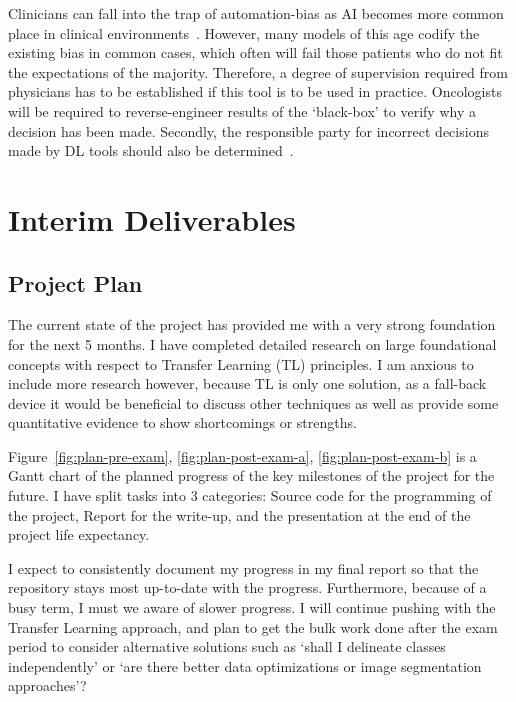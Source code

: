 \documentclass[11pt,twoside]{report}
\begin{document}
Clinicians can fall into the trap of automation-bias as AI becomes more common place in clinical environments~\cite{automation-bias}. However, many models of this age codify the existing bias in common cases, which often will fail those patients who do not fit the expectations of the majority. Therefore, a degree of supervision required from physicians has to be established if this tool is to be used in practice. Oncologists will be required to reverse-engineer results of the `black-box' to verify why a decision has been made. Secondly, the responsible party for incorrect decisions made by DL tools should also be determined~\cite{AI-in-cancer-diagnosis-era}.

\chapter{Interim Deliverables}

\section{Project Plan}

The current state of the project has provided me with a very strong foundation for the next 5 months. I have completed detailed research on large foundational concepts with respect to Transfer Learning (TL) principles. I am anxious to include more research however, because TL is only one solution, as a fall-back device it would be beneficial to discuss other techniques as well as provide some quantitative evidence to show shortcomings or strengths.

Figure~\ref{fig:plan-pre-exam}, \ref{fig:plan-post-exam-a}, \ref{fig:plan-post-exam-b} is a Gantt chart of the planned progress of the key milestones of the project for the future. I have split tasks into 3 categories: Source code for the programming of the project, Report for the write-up, and the presentation at the end of the project life expectancy. 

I expect to consistently document my progress in my final report so that the repository stays most up-to-date with the progress. Furthermore, because of a busy term, I must we aware of slower progress. I will continue pushing with the Transfer Learning approach, and plan to get the bulk work done after the exam period to consider alternative solutions such as `shall I delineate classes independently' or `are there better data optimizations or image segmentation approaches'?
\end{document}
